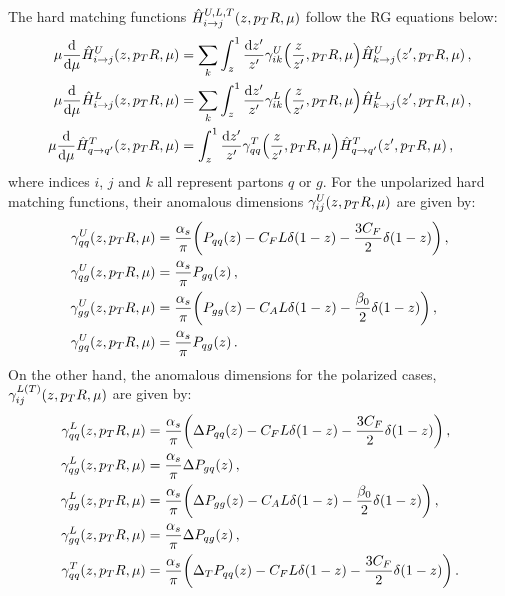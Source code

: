 \documentclass[a4paper, 11 pt]{article}
\begin{document}
The hard matching functions $\hat{H}_{i \to j}^{U,L,T} \pqty{z, p_TR , \mu}$ follow the RG equations below: 
\begin{align}
\mu \frac{\dd}{\dd{\mu}} \hat{H}_{i \to j}^U \pqty{z, p_TR , \mu}
& =
\sum _k \int _z^1 \frac{\dd{z'}}{z'} \gamma _{ik}^U \pqty{\frac{z}{z'}, p_TR, \mu}
\hat{H}_{k \to j}^U \pqty{z', p_TR, \mu}
\, , \\
\mu \frac{\dd}{\dd{\mu}} \hat{H}_{i \to j}^L \pqty{z, p_TR , \mu}
& =
\sum _k \int _z^1 \frac{\dd{z'}}{z'} \gamma _{ik}^L \pqty{\frac{z}{z'}, p_TR, \mu}
\hat{H}_{k \to j}^L \pqty{z', p_TR, \mu}
\, , \\
\mu \frac{\dd}{\dd{\mu}} \hat{H}_{q \to q'}^T \pqty{z, p_TR , \mu}
& =
\int _z^1 \frac{\dd{z'}}{z'} \gamma _{qq}^T \pqty{\frac{z}{z'} , p_TR , \mu}
\hat{H}_{q \to q'}^T \pqty{z', p_TR, \mu}
\, ,
\end{align}
where indices $i$, $j$ and $k$ all represent partons $q$ or $g$.
For the unpolarized hard matching functions, their anomalous dimensions $\gamma _{ij}^U \pqty{z, p_TR, \mu}$ are given by:
\begin{align}
\gamma _{qq}^U\pqty{z, p_TR, \mu}
& =
\frac{\alpha _s}{\pi} \pqty{P_{qq} \pqty{z} - C_F L \delta \pqty{1 - z} - \frac{3 C_F}{2} \delta \pqty{1 - z}}
\, , \\
\gamma _{qg}^U\pqty{z, p_TR, \mu}
& =
\frac{\alpha _s}{\pi} P_{gq} \pqty{z}
\, , \\
\gamma _{gg}^U\pqty{z, p_TR, \mu}
& =
\frac{\alpha _s}{\pi} \pqty{P_{g g} \pqty{z} - C_A L \delta \pqty{1 - z} - \frac{\beta _0}{2} \delta \pqty{1 - z}}
\, , \\
\gamma _{gq}^U\pqty{z, p_TR, \mu}
& =
\frac{\alpha _s}{\pi} P_{q g} \pqty{z}
\, .
\end{align}
On the other hand, the anomalous dimensions for the polarized cases, $\gamma _{ij}^{L \pqty{T}} \pqty{z, p_TR, \mu}$ are given by:
\begin{align}
\gamma _{qq}^L\pqty{z, p_TR, \mu}
& =
\frac{\alpha _s}{\pi} \pqty{\Delta P_{qq} \pqty{z} - C_F L \delta \pqty{1 - z} - \frac{3 C_F}{2} \delta \pqty{1 - z}}
\, , \label{e.lon_hard_function_gamma_qq} \\
\gamma _{qg}^L\pqty{z, p_TR, \mu}
& =
\frac{\alpha _s}{\pi} \Delta P_{gq} \pqty{z}
\, , \label{e.lon_hard_function_gamma_qg} \\
\gamma _{gg}^L\pqty{z, p_TR, \mu}
& =
\frac{\alpha _s}{\pi} \pqty{\Delta P_{g g} \pqty{z} - C_A L \delta \pqty{1 - z} - \frac{\beta _0}{2} \delta \pqty{1 - z}}
\, , \label{e.lon_hard_function_gamma_gg} \\
\gamma _{gq}^L\pqty{z, p_TR, \mu}
& =
\frac{\alpha _s}{\pi} \Delta P_{q g} \pqty{z}
\, , \label{e.lon_hard_function_gamma_gq} \\
\gamma _{qq}^T\pqty{z, p_TR, \mu}
& =
\frac{\alpha _s}{\pi} \pqty{\Delta _T P_{q q} \pqty{z} - C_F L \delta \pqty{1 - z} - \frac{3 C_F}{2} \delta \pqty{1 - z}}
\, . \label{e.tra_hard_function_gamma_qq}
\end{align}
\end{document}
